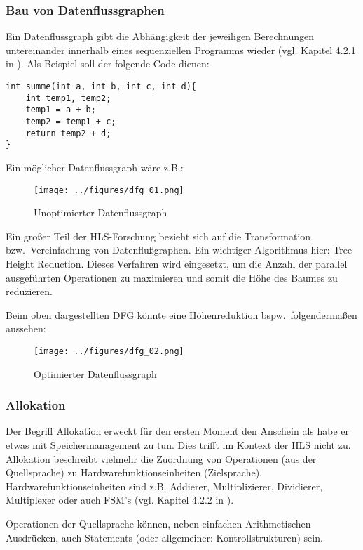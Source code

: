 \documentclass[oneside,a4paper]{article}
\begin{document}
\subsubsection{Bau von Datenflussgraphen}
Ein Datenflussgraph gibt die Abhängigkeit der jeweiligen Berechnungen
untereinander innerhalb eines sequenziellen Programms wieder
(vgl. Kapitel 4.2.1 in \cite {BLUE}).
Als Beispiel soll der folgende Code dienen:

\begin{lstlisting}[style=c]
int summe(int a, int b, int c, int d){
    int temp1, temp2;
    temp1 = a + b;
    temp2 = temp1 + c;
    return temp2 + d;
}
\end{lstlisting}

Ein möglicher Datenflussgraph wäre z.B.:

\begin{figure}[H]
  \centering
  \texttt{[image: ../figures/dfg\_01.png]}
  \caption{Unoptimierter Datenflussgraph}
\label{fig:dfg01}
\end{figure}

Ein großer Teil der HLS-Forschung bezieht sich auf die
Transformation bzw.\ Vereinfachung von Datenflußgraphen.
Ein wichtiger Algorithmus hier: Tree Height Reduction.
Dieses Verfahren wird eingesetzt, um die Anzahl der parallel
ausgeführten Operationen zu maximieren und somit die Höhe
des Baumes zu reduzieren.

Beim oben dargestellten DFG könnte eine Höhenreduktion
bspw.\ folgendermaßen aussehen:

\begin{figure}[H]
  \centering
  \texttt{[image: ../figures/dfg\_02.png]}
  \caption{Optimierter Datenflussgraph}
\label{fig:dfg02}
\end{figure}

\subsubsection{Allokation}
Der Begriff Allokation erweckt für den ersten Moment den Anschein
als habe er etwas mit Speichermanagement zu tun. Dies trifft im
Kontext der HLS nicht zu. Allokation beschreibt vielmehr die
Zuordnung von Operationen (aus der Quellsprache) zu Hardwarefunktionseinheiten
(Zielsprache). Hardwarefunktionseinheiten sind z.B. Addierer,
Multiplizierer, Dividierer, Multiplexer oder auch FSM's
(vgl. Kapitel 4.2.2 in \cite{BLUE}).

Operationen der Quellsprache können, neben einfachen Arithmetischen
Ausdrücken, auch Statements (oder allgemeiner: Kontrollstrukturen) sein.
\end{document}

